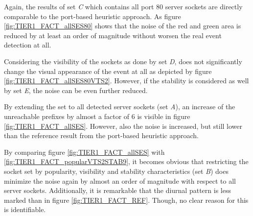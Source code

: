 Again, the results of set \emph{C} which contains all port 80 \glspl{server socket} are directly comparable to the port-based heuristic approach. 
As figure \ref{fig:TIER1_FACT_allSES80} shows that the noise of the red and green area is reduced by at least an order of magnitude without worsen the real event detection at all.

Considering the visibility of the sockets as done by set \emph{D}, does not significantly change the visual appearance of the event at all as depicted by figure \ref{fig:TIER1_FACT_allSES80VTS2}.
However, if the stability is considered as well by set \emph{E}, the noise can be even further reduced. 

By extending the set to all detected \glspl{server socket} (set \emph{A}), an increase of the unreachable prefixes by almost a factor of 6  is visible in figure \ref{fig:TIER1_FACT_allSES}. 
However, also the noise is increased, but still lower than the reference result from the port-based heuristic approach. 

By comparing figure \ref{fig:TIER1_FACT_allSES} with \ref{fig:TIER1_FACT_popularVTS2STAB9}, it becomes obvious that restricting the socket set by popularity, visibility and stability characteristics (set \emph{B}) does minimize the noise again by almost an order of magnitude with respect to all \glspl{server socket}. 
Additionally, it is remarkable that the diurnal pattern is less marked than in figure \ref{fig:TIER1_FACT_REF}. 
Though, no clear reason for this is identifiable. 

